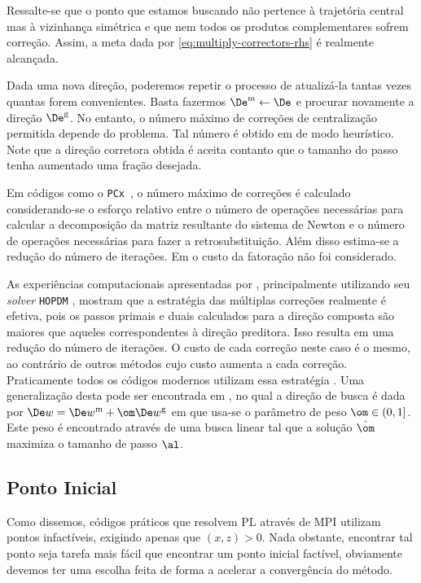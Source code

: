 Ressalte-se que o ponto que estamos buscando não pertence à trajetória central
mas à vizinhança simétrica e que nem todos os produtos complementares sofrem
correção. Assim, a meta dada por \eqref{eq:multiply-correctors-rhs} é
realmente alcançada. 

Dada uma nova direção, poderemos repetir o processo de atualizá-la tantas vezes
quantas forem convenientes. Basta fazermos $\DeMe  \leftarrow \De$ e procurar
novamente a direção $\DeMu$. No entanto, o número máximo de correções de
centralização permitida depende do problema. Tal número é obtido em
\cite{Gondzio:1996uw} de modo heurístico. Note que a direção corretora
obtida é aceita contanto que o tamanho do passo tenha aumentado  uma fração
desejada.


Em códigos como o \texttt{PCx}~\cite{Czyzyk:1999hk}, o
número máximo de correções é calculado considerando-se o esforço relativo entre o
número de operações necessárias para calcular a decomposição da matriz
resultante do sistema de Newton e o número de operações necessárias para fazer a retrosubstituição. Além disso estima-se a redução do número de iterações. Em
\cite{Gondzio:1996uw}  o custo da fatoração não foi
considerado. 
    

As experiências computacionais apresentadas por \citeauthor{Gondzio:1996uw}, principalmente utilizando seu \emph{solver} \texttt{HOPDM} \cite{Gondzio:1995kv,Gondzio:1996uw},   mostram
que a estratégia das múltiplas correções realmente é efetiva, pois os passos
primais e duais calculados para a direção composta são maiores que aqueles
correspondentes à direção preditora.
Isso resulta em uma redução do número de iterações. O custo de cada
correção neste caso é o mesmo, ao contrário de outros métodos cujo custo aumenta a cada
correção. Praticamente todos os códigos modernos utilizam essa estratégia
\cite[Apêndice B]{Wright:Primal-dual-interior-point:1997h}. Uma generalização
desta pode ser encontrada em \cite{Colombo:2008ia}, no qual a direção de
busca é dada por $\Dew = \DeMew + \om\DeMuw$ em que usa-se o parâmetro de peso
$\om\in(0,1]$. Este peso é encontrado através de uma busca linear tal que
a solução $\hat{\om}$  maximiza o tamanho de passo $\al$.



\subsection{Ponto Inicial}\label{subsec:initial-point}

Como dissemos, códigos práticos que resolvem \ac{PL} através de \ac{MPI}
utilizam pontos infactíveis, exigindo apenas que $(x,z)>0$. Nada
obstante, encontrar tal ponto seja tarefa mais fácil que encontrar
um ponto inicial factível, obviamente devemos ter uma escolha  feita de forma a
acelerar a convergência do método. 

